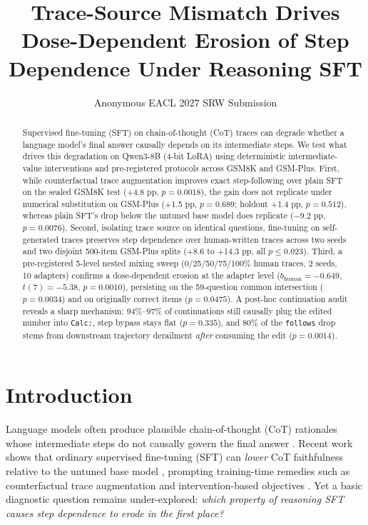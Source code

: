 \documentclass[11pt]{article}
\title{Trace-Source Mismatch Drives Dose-Dependent Erosion of Step Dependence Under Reasoning SFT}
\author{Anonymous EACL 2027 SRW Submission}
\begin{document}
\maketitle

\begin{abstract}
Supervised fine-tuning (SFT) on chain-of-thought (CoT) traces can degrade whether a language model's final answer causally depends on its intermediate steps.
We test what drives this degradation on Qwen3-8B (4-bit LoRA) using deterministic intermediate-value interventions and pre-registered protocols across GSM8K and GSM-Plus.
First, while counterfactual trace augmentation improves exact step-following over plain SFT on the sealed GSM8K test (+4.8 pp, $p=0.0018$), the gain does not replicate under numerical substitution on GSM-Plus (+1.5 pp, $p=0.689$; holdout +1.4 pp, $p=0.512$), whereas plain SFT's drop below the untuned base model does replicate ($-9.2$ pp, $p=0.0076$).
Second, isolating trace source on identical questions, fine-tuning on self-generated traces preserves step dependence over human-written traces across two seeds and two disjoint 500-item GSM-Plus splits (+8.6 to +14.3 pp, all $p \le 0.023$).
Third, a pre-registered 5-level nested mixing sweep (0/25/50/75/100\% human traces, 2 seeds, 10 adapters) confirms a dose-dependent erosion at the adapter level ($b_{\text{human}} = -0.649$, $t(7) = -5.38$, $p = 0.0010$), persisting on the 59-question common intersection ($p = 0.0034$) and on originally correct items ($p = 0.0475$).
A post-hoc continuation audit reveals a sharp mechanism: 94\%--97\% of continuations still causally plug the edited number into \texttt{Calc:}, step bypass stays flat ($p = 0.335$), and 80\% of the \texttt{follows} drop stems from downstream trajectory derailment \emph{after} consuming the edit ($p = 0.0014$).
\end{abstract}

\section{Introduction}
\label{sec:intro}

Language models often produce plausible chain-of-thought (CoT) rationales whose intermediate steps do not causally govern the final answer \citep{lanham2023measuring,turpin2024language}.
Recent work shows that ordinary supervised fine-tuning (SFT) can \emph{lower} CoT faithfulness relative to the untuned base model \citep{lobo2024impact}, prompting training-time remedies such as counterfactual trace augmentation and intervention-based objectives \citep{paul2024frodo,swaroop2025lift,akter2025ccr,wang2026case}.
Yet a basic diagnostic question remains under-explored: \emph{which property of reasoning SFT causes step dependence to erode in the first place?}
\end{document}
